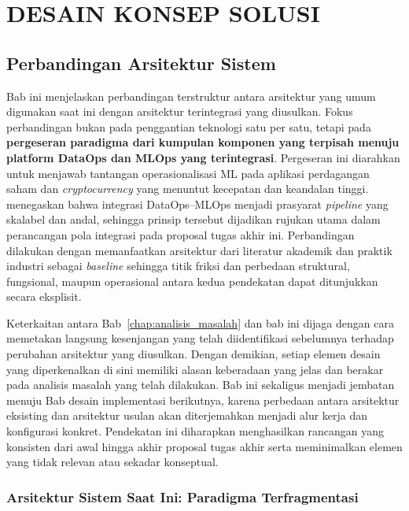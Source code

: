 \chapter{DESAIN KONSEP SOLUSI}
\label{chap:desain_konsep_solusi}

\section{Perbandingan Arsitektur Sistem}

Bab ini menjelaskan perbandingan terstruktur antara arsitektur yang umum digunakan saat ini dengan arsitektur terintegrasi yang diusulkan. Fokus perbandingan bukan pada penggantian teknologi satu per satu, tetapi pada \textbf{pergeseran paradigma dari kumpulan komponen yang terpisah menuju platform DataOps dan MLOps yang terintegrasi}. Pergeseran ini diarahkan untuk menjawab tantangan operasionalisasi ML pada aplikasi perdagangan saham dan \textit{cryptocurrency} yang menuntut kecepatan dan keandalan tinggi. \textcite{jain2025integrating} menegaskan bahwa integrasi DataOps--MLOps menjadi prasyarat \textit{pipeline} yang skalabel dan andal, sehingga prinsip tersebut dijadikan rujukan utama dalam perancangan pola integrasi pada proposal tugas akhir ini. Perbandingan dilakukan dengan memanfaatkan arsitektur dari literatur akademik dan praktik industri sebagai \textit{baseline} sehingga titik friksi dan perbedaan struktural, fungsional, maupun operasional antara kedua pendekatan dapat ditunjukkan secara eksplisit.

Keterkaitan antara Bab~\ref{chap:analisis_masalah} dan bab ini dijaga dengan cara memetakan langsung kesenjangan yang telah diidentifikasi sebelumnya terhadap perubahan arsitektur yang diusulkan. Dengan demikian, setiap elemen desain yang diperkenalkan di sini memiliki alasan keberadaan yang jelas dan berakar pada analisis masalah yang telah dilakukan. Bab ini sekaligus menjadi jembatan menuju Bab desain implementasi berikutnya, karena perbedaan antara arsitektur eksisting dan arsitektur usulan akan diterjemahkan menjadi alur kerja dan konfigurasi konkret. Pendekatan ini diharapkan menghasilkan rancangan yang konsisten dari awal hingga akhir proposal tugas akhir serta meminimalkan elemen yang tidak relevan atau sekadar konseptual.

\subsection{Arsitektur Sistem Saat Ini: Paradigma Terfragmentasi}

